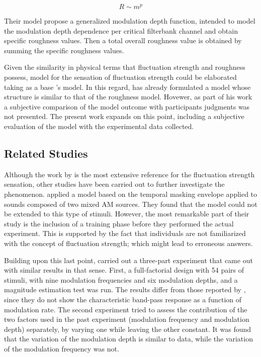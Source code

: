 \documentclass[../main.tex]{subfiles}
\begin{document}
\begin{theoreticalbackground}
\begin{equation}
  R \sim m^p
  \label{eq:R}
\end{equation}

Their model propose a generalized modulation depth function, intended to model
the modulation depth dependence per critical filterbank channel and obtain
specific roughness values. Then a total overall roughness value is obtained by
summing the specific roughness values.

Given the similarity in physical terms that fluctuation strength and roughness
possess,  model for the sensation of fluctuation strength could be elaborated
taking as a base \citeauthor{daniel1997psychoacoustical}'s model. In this
regard, \textcite{Sontacchi1998} has already formulated a model whose structure
is similar to that of the roughness model. Hovewer, as part of his work a
subjective comparison of the model outcome with participants judgments was not
presented. The present work expands on this point, including a subjective
evaluation of the model with the experimental data collected.

\subsection{Related Studies}

Although the work by \citeauthor{Fastl2007Psychoacoustics} is the most extensive
reference for the fluctuation strength sensation, other studies have been
carried out to further investigate the phenomenon.
\textcite{Accolti2009Fluctuation} applied a model based on the temporal masking
envelope applied to sounds composed of two mixed \gls{AM} sources. They found
that the model could not be extended to this type of stimuli. However, the most
remarkable part of their study is the inclusion of a training phase before they
performed the actual experiment. This is supported by the fact that individuals
are not familiarized with the concept of fluctuation strength; which might lead
to erroneous answers.

Building upon this last point, \citeauthor{Wickelmaier2004Scaling} carried out
a three-part experiment that came out with similar results in that sense. First,
a full-factorial design with 54 pairs of stimuli, with nine modulation
frequencies and six modulation depths, and a magnitude estimation test was run.
The results differ from those reported by \citeauthor{Fastl2007Psychoacoustics},
since they do not show the characteristic band-pass response as a function of
modulation rate. The second experiment tried to assess the contribution of the
two factors used in the past experiment (modulation frequency and modulation
depth) separately, by varying one while leaving the other constant. It was found
that the variation of the modulation depth is similar to
\citeauthor{Fastl2007Psychoacoustics} data, while the variation of the
modulation frequency was not.


\end{theoreticalbackground}
\end{document}
